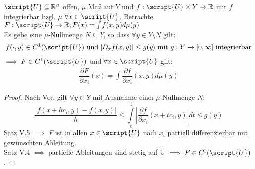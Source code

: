   \begin{lemma}
    $\script{U} \subseteq \mathbb{R}^n$ offen, $\mu$ Maß auf $Y$ und $f: \script{U} \times Y \to \mathbb{R}$ mit $f$ integrierbar bzgl. $\mu \ \forall x \in \script{U}$. Betrachte $F: \script{U} \to \mathbb{R}, F(x) = \int f(x,y) d\mu(y)$\\
    Es gebe eine $\mu$-Nullmenge $N \subseteq Y$, so dass $\forall y \in Y \setminus N$ gilt:
    \begin{align*}
      f(\cdot, y) \in C^1(\script{U}) \text{ und } |D_x f(x,y)| \leq g(y) \text{ mit } g: Y \to [0, \infty] \text{ integrierbar}
    \end{align*}
    $\implies F \in C^1(\script{U})$ und $\forall x \in \script{U}$ gilt:
    \begin{align*}
      \dfrac{\partial F}{\partial x_i}(x) = \int \dfrac{\partial f}{\partial x_i}(x,y) d\mu(y)
    \end{align*}
  \end{lemma}

  \begin{proof}
    Nach Vor. gilt $\forall y\in Y$ mit Ausnahme einer $\mu$-Nullmenge $N$: \\
    $$ \frac{|f(x+hc_i, y)-f(x,y)|}{h} \leq \int\limits_{0}^1 \left| \frac{\partial f}{\partial x_i} (x+tc_i,y) \right|  dt \leq g(y) $$
    Satz V.5 $\implies$ $F$ ist in allen $x\in \script{U}$ nach $x_i$ partiell differenzierbar mit gewünschten Ableitung. \\
    Satz V.4 $\implies$ partielle Ableitungen sind stetig auf U $\implies F\in C^1(\script{U})$. 
  \end{proof}

